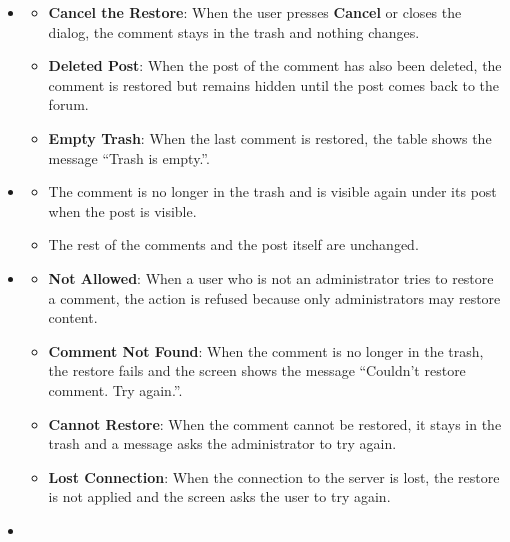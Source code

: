 \begin{itemize}[leftmargin=1.6em,topsep=4pt,itemsep=3pt,parsep=0pt,label=$\bullet$]
\begin{itemize}[leftmargin=2.2em,topsep=2pt,itemsep=3pt,parsep=0pt,label=$\circ$]
        \end{itemize}
    \item {}
        \begin{itemize}[leftmargin=2.2em,topsep=2pt,itemsep=3pt,parsep=0pt,label=$\circ$]
            \item \textbf{Cancel the Restore}: When the user presses \textbf{Cancel} or closes the dialog, the comment stays in the trash and nothing changes.
            \item \textbf{Deleted Post}: When the post of the comment has also been deleted, the comment is restored but remains hidden until the post comes back to the forum.
            \item \textbf{Empty Trash}: When the last comment is restored, the table shows the message ``Trash is empty.''.
        \end{itemize}
    \item {}
        \begin{itemize}[leftmargin=2.2em,topsep=2pt,itemsep=3pt,parsep=0pt,label=$\circ$]
            \item The comment is no longer in the trash and is visible again under its post when the post is visible.
            \item The rest of the comments and the post itself are unchanged.
        \end{itemize}
    \item {}
        \begin{itemize}[leftmargin=2.2em,topsep=2pt,itemsep=3pt,parsep=0pt,label=$\circ$]
            \item \textbf{Not Allowed}: When a user who is not an administrator tries to restore a comment, the action is refused because only administrators may restore content.
            \item \textbf{Comment Not Found}: When the comment is no longer in the trash, the restore fails and the screen shows the message ``Couldn't restore comment. Try again.''.
            \item \textbf{Cannot Restore}: When the comment cannot be restored, it stays in the trash and a message asks the administrator to try again.
            \item \textbf{Lost Connection}: When the connection to the server is lost, the restore is not applied and the screen asks the user to try again.
        \end{itemize}
    \item {}

\end{itemize}
